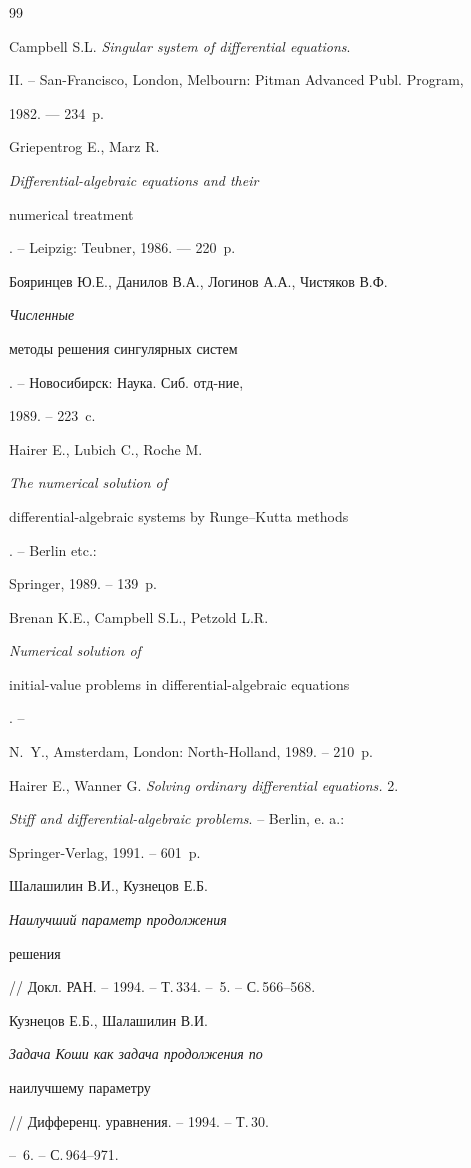 \begin{thebibliography}{99}


Campbell S.L. {\em Singular system of differential equations}.


II. -- San-Francisco, London, Melbourn: Pitman Advanced Publ. Program,


1982. --- 234~p.




Griepentrog E., Marz R. {\em Differential-algebraic equations and their


numerical treatment}. -- Leipzig: Teubner, 1986. --- 220~p.




Бояринцев Ю.Е., Данилов В.А., Логинов А.А., Чистяков В.Ф. {\em Численные


методы решения сингулярных систем}. -- Новосибирск: Наука. Сиб. отд-ние,


1989. -- 223~c.




Hairer E., Lubich C., Roche M. {\em The numerical solution of


differential-algebraic systems by Runge--Kutta methods}. -- Berlin etc.:


Springer, 1989. -- 139~p.




Brenan K.E., Campbell S.L., Petzold L.R. {\em Numerical solution of


initial-value problems in differential-algebraic equations}. --


N. \,Y., Amsterdam, London: North-Holland, 1989. -- 210~p.




Hairer E., Wanner G. {\em Solving ordinary differential equations.} 2.


{\em Stiff and differential-algebraic problems}. -- Berlin, e. a.:


Springer-Verlag, 1991. -- 601~p.




Шалашилин В.И., Кузнецов Е.Б. {\em Наилучший параметр продолжения


решения} // Докл. РАН. -- 1994. -- Т.\,334. -- \No\,5. -- С.\,566--568.




Кузнецов Е.Б., Шалашилин В.И. {\em Задача Коши как задача продолжения по


наилучшему параметру} // Дифференц. уравнения. -- 1994. -- Т.\,30.


-- \No\,6. -- С.\,964--971.



\end{thebibliography}
